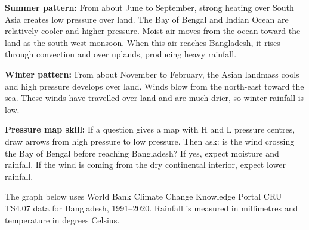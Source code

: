 \documentclass[11pt,a4paper]{article}
\begin{document}
\textbf{Summer pattern:} From about June to September, strong heating over South Asia creates low pressure over land. The Bay of Bengal and Indian Ocean are relatively cooler and higher pressure. Moist air moves from the ocean toward the land as the south-west monsoon. When this air reaches Bangladesh, it rises through convection and over uplands, producing heavy rainfall.

\textbf{Winter pattern:} From about November to February, the Asian landmass cools and high pressure develops over land. Winds blow from the north-east toward the sea. These winds have travelled over land and are much drier, so winter rainfall is low.

\begin{skillbox}
\textbf{Pressure map skill:} If a question gives a map with H and L pressure centres, draw arrows from high pressure to low pressure. Then ask: is the wind crossing the Bay of Bengal before reaching Bangladesh? If yes, expect moisture and rainfall. If the wind is coming from the dry continental interior, expect lower rainfall.
\end{skillbox}

The graph below uses World Bank Climate Change Knowledge Portal CRU TS4.07 data for Bangladesh, 1991--2020. Rainfall is measured in millimetres and temperature in degrees Celsius.

\begin{center}
\end{center}
\end{document}
